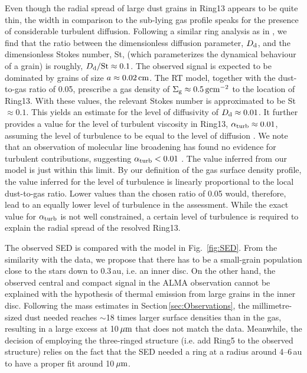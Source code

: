 \documentclass[fleqn,usenatbib,useAMS]{mnras}
\begin{document}
Even though the radial spread of large dust grains in Ring13 appears to be quite thin, the width in comparison to the sub-lying gas profile speaks for the presence of considerable turbulent diffusion. Following a similar ring analysis as in \citet{2018ApJ...869L..46D}, we find that the ratio between the dimensionless diffusion parameter, $D_{\rm d}$, and the dimensionless Stokes number, St, (which parameterizes the dynamical behaviour of a grain) is roughly, $D_{\rm d}/{\rm St}\approx 0.1$. The observed signal is expected to be dominated by grains of size $a\approx 0.02\,{\rm cm}$. The RT model, together with the dust-to-gas ratio of 0.05, prescribe a gas density of $\Sigma_{\rm g} \approx 0.5\,{\rm g}{\rm cm}^{-2}$ to the location of Ring13. With these values, the relevant Stokes number is approximated to be St$\approx 0.1$. This yields an estimate for the level of diffusivity of $D_{\rm d}\approx 0.01$. It further provides a value for the level of turbulent viscosity in Ring13, $\alpha_{\rm turb}\approx 0.01$, assuming the level of turbulence to be equal to the level of diffusion \citep{2007Icar..192..588Y}. We note that an observation of molecular line broadening has found no evidence for turbulent contributions, suggesting $\alpha_{\rm turb}<0.01$ \citep{Flaherty_2020}. The value inferred from our model is just within this limit. By our definition of the gas surface density profile, the value inferred for the level of turbulence is linearly proportional to the local dust-to-gas ratio. Lower values than the chosen ratio of 0.05 would, therefore, lead to an equally lower level of turbulence in the assessment. While the exact value for $\alpha_{\rm turb}$ is not well constrained, a certain level of turbulence is required to explain the radial spread of the resolved Ring13.

The observed SED is compared with the model in Fig.~\ref{fig:SED}. From the similarity with the data, we propose that there has to be a small-grain population close to the stars down to 0.3\,au, i.e. an inner disc. On the other hand, the observed central and compact signal in the ALMA observation cannot be explained with the hypothesis of thermal emission from large grains in the inner disc. Following the mass estimates in Section\,\ref{sec:Observations}, the millimetre-sized dust needed reaches $\sim$18 times larger surface densities than in the gas, resulting in a large excess at 10$\,\hbox{$\mu$m}$ that does not match the data. Meanwhile, the decision of employing the three-ringed structure (i.e. add Ring5 to the observed structure) relies on the fact that the SED needed a ring at a radius around 4--6\,au to have a proper fit around 10\,$\hbox{$\mu$m}$. 
\end{document}
